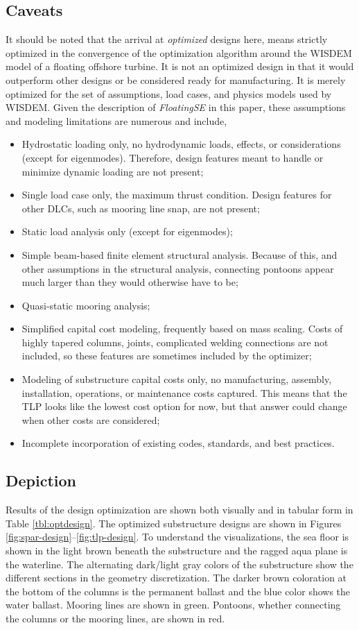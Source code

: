 \subsection{Caveats}
It should be noted that the arrival at \textit{optimized} designs here,
means strictly optimized in the convergence of the optimization
algorithm around the WISDEM model of a floating offshore turbine.  It is
not an optimized design in that it would outperform other designs or be
considered ready for manufacturing.  It is merely optimized for the set
of assumptions, load cases, and physics models used by WISDEM.  Given
the description of \textit{FloatingSE} in this paper, these assumptions
and modeling limitations are numerous and include,
\begin{itemize}
\item Hydrostatic loading only, no hydrodynamic loads, effects, or
  considerations (except for eigenmodes).  Therefore, design features
  meant to handle or minimize dynamic loading are not present;
\item Single load case only, the maximum thrust condition.  Design
  features for other DLCs, such as mooring line snap, are not present;
\item Static load analysis only (except for eigenmodes);
\item Simple beam-based finite element structural analysis.  Because of
  this, and other assumptions in the structural analysis, connecting
  pontoons appear much larger than they would otherwise have to be;
\item Quasi-static mooring analysis;
\item Simplified capital cost modeling, frequently based on mass
  scaling.  Costs of highly tapered columns, joints, complicated welding
  connections are not included, so these features are sometimes included
  by the optimizer;
\item Modeling of substructure capital costs only, no manufacturing,
  assembly, installation, operations, or maintenance costs captured.
  This means that the TLP looks like the lowest cost option for now,
  but that answer could change when other costs are considered;
\item Incomplete incorporation of existing codes, standards, and best
  practices.
\end{itemize}

\subsection{Depiction}
Results of the design optimization are shown both visually and in
tabular form in Table \ref{tbl:optdesign}.  The optimized substructure
designs are shown in Figures
\ref{fig:spar-design}--\ref{fig:tlp-design}.  To understand the
visualizations, the sea floor is shown in the light brown beneath the
substructure and the ragged aqua plane is the waterline.  The
alternating dark/light gray colors of the substructure show the
different sections in the geometry discretization.  The darker brown
coloration at the bottom of the columns is the permanent ballast and the
blue color shows the water ballast.  Mooring lines are shown in green.
Pontoons, whether connecting the columns or the mooring lines, are shown
in red.

